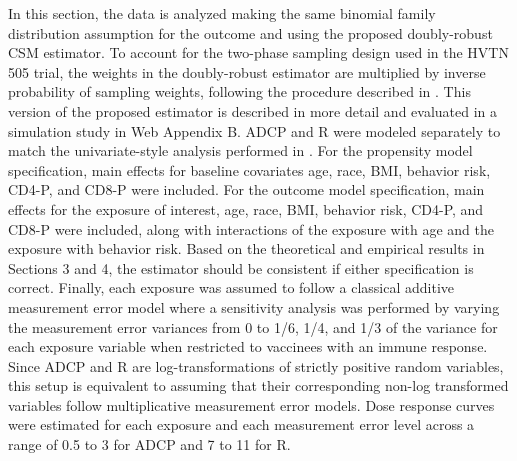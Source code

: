 \documentclass[useAMS,usenatbib,referee]{biom}
\newcommand{\RNum}[1]{\uppercase\expandafter{\romannumeral #1\relax}}
\begin{document}
In this section, the data is analyzed making the same binomial family distribution assumption for the outcome and using the proposed doubly-robust CSM estimator. To account for the two-phase sampling design used in the HVTN 505 trial, the weights in the doubly-robust estimator are multiplied by inverse probability of sampling weights, following the procedure described in \citet{wang2009}. This version of the proposed estimator is described in more detail and evaluated in a simulation study in Web Appendix B. ADCP and R\RNum{2} were modeled separately to match the univariate-style analysis performed in \citet{neidich2019}. For the propensity model specification, main effects for baseline covariates age, race, BMI, behavior risk, CD4-P, and CD8-P were included. For the outcome model specification, main effects for the exposure of interest, age, race, BMI, behavior risk, CD4-P, and CD8-P were included, along with interactions of the exposure with age and the exposure with behavior risk. Based on the theoretical and empirical results in Sections 3 and 4, the estimator should be consistent if either specification is correct. Finally, each exposure was assumed to follow a classical additive measurement error model where a sensitivity analysis was performed by varying the measurement error variances from 0 to 1/6, 1/4, and 1/3 of the variance for each exposure variable when restricted to vaccinees with an immune response. Since ADCP and R\RNum{2} are log-transformations of strictly positive random variables, this setup is equivalent to assuming that their corresponding non-log transformed variables follow multiplicative measurement error models. Dose response curves were estimated for each exposure and each measurement error level across a range of 0.5 to 3 for ADCP and 7 to 11 for R\RNum{2}.
\end{document}
